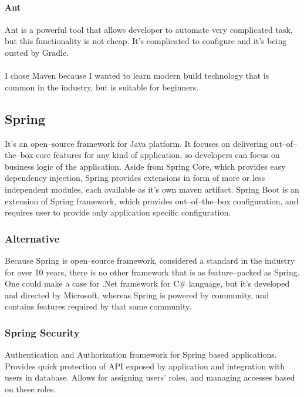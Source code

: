 \documentclass[a4paper,twoside,12pt]{book}
\begin{document}
        \paragraph{Ant}
          Ant is a powerful tool that allows developer to automate very complicated task, but this functionality is not cheap.
          It's complicated to configure and it's being ousted by Gradle\cite{bib:ant}.

      \paragraph{} %
      I chose Maven because I wanted to learn modern build technology that is common in the industry, but is suitable for beginners.

    \subsection{Spring}
      It's an open--source framework for Java platform. It focuses on delivering out--of--the--box core features for any kind of application, 
      so developers can focus on business logic of the application. 
      Aside from Spring Core, which provides easy dependency injection, Spring provides extensions in form of more or less independent modules, each available as it's own maven artifact.\cite{bib:spring}
      Spring Boot is an extension of Spring framework, which provides out--of--the--box configuration, and requires user to provide only application specific configuration.
      
      \subsubsection{Alternative}
        Because Spring is open--source framework, considered a standard in the industry for over 10 years, there is no other framework that is as feature--packed as Spring.
        One could make a case for .Net framework for C\# language, but it's developed and directed by Microsoft\cite{bib:thai2003net}, 
        whereas Spring is powered by community, and contains features required by that same community. 

      \subsubsection{Spring Security}
        Authentication and Authorization framework for Spring based applications. Provides quick protection of API exposed by application and
        integration with users in database. Allows for assigning users' roles, and managing accesses based on these roles\cite{bib:spring_security}.
\end{document}
